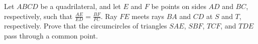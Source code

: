 Let $ABCD$ be a quadrilateral, and let $E$ and $F$ be points on sides $AD$ and $BC$,  respectively, such that $\frac{AE}{ED} = \frac{BF}{FC}$. Ray $FE$ meets rays $BA$ and $CD$ at $S$ and $T$,  respectively. Prove that the circumcircles of triangles $SAE$,  $SBF$,  $TCF$,  and $TDE$ pass through a common point.